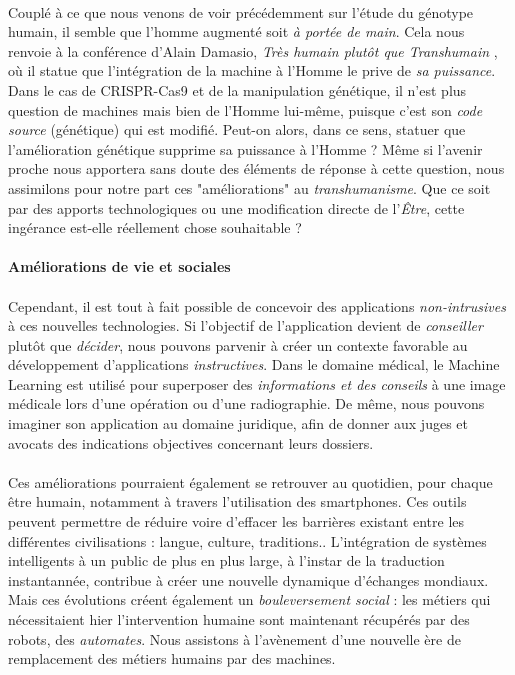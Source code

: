 \paragraph{} Couplé à ce que nous venons de voir précédemment sur l'étude du génotype humain, il semble que
l'homme augmenté soit \emph{à portée de main}. Cela nous renvoie à la conférence d'Alain Damasio, \emph{Très humain
plutôt que Transhumain} \cite{Damasio2}, où il statue que l'intégration de la machine à l'Homme le prive de \emph{sa 
puissance}. Dans le cas de CRISPR-Cas9 et de la manipulation génétique, il n'est plus question de machines
mais bien de l'Homme lui-même, puisque c'est son \emph{code source} (génétique) qui est modifié. Peut-on alors, dans ce sens,
statuer que l'amélioration génétique supprime sa puissance à l'Homme ? Même si l'avenir proche nous apportera sans doute
des éléments de réponse à cette question, nous assimilons pour notre part ces "améliorations" au \emph{transhumanisme}.
Que ce soit par des apports technologiques ou une modification directe de l'\emph{Être}, cette ingérance est-elle
réellement chose souhaitable ?

\paragraph{Améliorations de vie et sociales}

\paragraph{} Cependant, il est tout à fait possible de concevoir des applications \emph{non-intrusives} à ces
nouvelles technologies. Si l'objectif de l'application devient de \emph{conseiller} plutôt que \emph{décider},
nous pouvons parvenir à créer un contexte favorable au développement d'applications \emph{instructives}. Dans le
domaine médical, le Machine Learning est utilisé pour superposer des \emph{informations et des conseils} à
une image médicale lors d'une opération ou d'une radiographie. De même, nous pouvons imaginer son 
application au domaine juridique, afin de donner aux juges et avocats des indications objectives concernant leurs
dossiers.

\paragraph{} Ces améliorations pourraient également se retrouver au quotidien, pour chaque être humain, notamment
à travers l'utilisation des smartphones. Ces outils peuvent permettre de réduire voire d'effacer les barrières 
existant entre les différentes civilisations : langue, culture, traditions.. L'intégration de systèmes intelligents 
à un public de plus en plus large, à l'instar de la traduction instantannée, contribue à créer une nouvelle
dynamique d'échanges mondiaux. Mais ces évolutions créent également un \emph{bouleversement social} : les métiers
qui nécessitaient hier l'intervention humaine sont maintenant récupérés par des robots, des \emph{automates}.
Nous assistons à l'avènement d'une nouvelle ère de remplacement des métiers humains par des machines.

